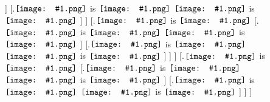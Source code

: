 \documentclass[notes]{beamer}
\newcommand{\term}[1]{$\vcenter{\hbox{\texttt{[image: \#1.png]}}}$}
\newcommand{\mybox}[1]{\setlength{\fboxsep}{0pt}\colorbox{orange!10}{#1}}
\begin{document}
\begin{frame}[fragile]
           ]
           [.\mybox{\term{demo-term-2-p-} is \term{demo-pgmr-prop}}
             \mybox{\term{demo-term-2-p} is \term{demo-pgmr-atom}}
           ]
         ]
         [.\mybox{\term{demo-term-2-5} is \term{demo-pgmr-prop}}
           [.\mybox{\term{demo-term-2-p-} is \term{demo-pgmr-prop}}
             \mybox{\term{demo-term-2-p} is \term{demo-pgmr-atom}}
           ]
           [.\mybox{\term{demo-term-2-q-} is \term{demo-pgmr-prop}}
             \mybox{\term{demo-term-2-q} is \term{demo-pgmr-atom}}
           ]
         ]
       ]
       [.\mybox{\term{demo-term-2-6} is \term{demo-pgmr-prop}}
         [.\mybox{\term{demo-term-2-p-} is \term{demo-pgmr-prop}}
           \mybox{\term{demo-term-2-p} is \term{demo-pgmr-atom}}
         ]
         [.\mybox{\term{demo-term-2-q-} is \term{demo-pgmr-prop}}
           \mybox{\term{demo-term-2-q} is \term{demo-pgmr-atom}}
         ]
       ]
     ]
\end{frame}
\end{document}
